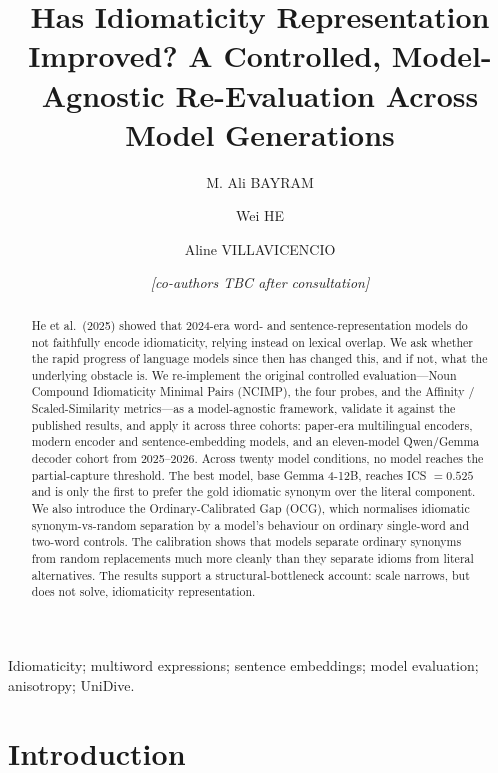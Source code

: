 \documentclass[twoside]{romjist}
\title{Has Idiomaticity Representation Improved? A Controlled,
Model-Agnostic Re-Evaluation Across Model Generations}
\author[1]{M. Ali \uppercase{Bayram}}
\author[2]{Wei \uppercase{He}}
\author[3]{Aline \uppercase{Villavicencio}}
\author[ ]{\emph{[co-authors TBC after consultation]}}
\affil[1]{{\small Affiliation TBC}}
\affil[2]{{\small Affiliation TBC}}
\affil[3]{{\small Affiliation TBC}}
\affil[ ]{{\small \texttt{Email: TBC}}}
\begin{document}


\maketitle

\begin{abstract}
He et al.\ (2025) showed that 2024-era word- and sentence-representation models do not
faithfully encode idiomaticity, relying instead on lexical overlap. We ask whether the rapid
progress of language models since then has changed this, and if not, what the underlying
obstacle is. We re-implement the original controlled evaluation---Noun Compound Idiomaticity
Minimal Pairs (NCIMP), the four probes, and the Affinity / Scaled-Similarity metrics---as a
model-agnostic framework, validate it against the published results, and apply it across three
cohorts: paper-era multilingual encoders, modern encoder and sentence-embedding models, and
an eleven-model Qwen/Gemma decoder cohort from 2025--2026. Across twenty model conditions, no
model reaches the partial-capture threshold. The best model, base Gemma 4-12B, reaches
ICS $=0.525$ and is only the first to prefer the gold idiomatic synonym over the literal
component. We also introduce the Ordinary-Calibrated Gap (OCG), which normalises idiomatic
synonym-vs-random separation by a model's behaviour on ordinary single-word and two-word
controls. The calibration shows that models separate ordinary synonyms from random
replacements much more cleanly than they separate idioms from literal alternatives. The results
support a structural-bottleneck account: scale narrows, but does not solve, idiomaticity
representation.
\end{abstract}

\begin{keywords}
Idiomaticity; multiword expressions; sentence embeddings; model evaluation; anisotropy; UniDive.
\end{keywords}

\section{Introduction}
\end{document}
